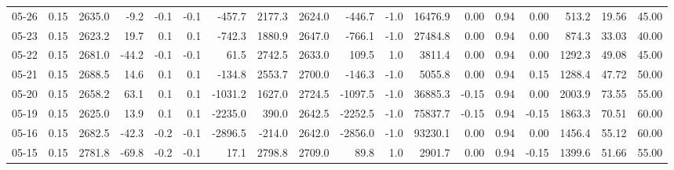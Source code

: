\begin{threeparttable}
{\begin{tabular}{lrrrrrrrrrrrrrrrrr}
  05-26 &     0.15 & 2635.0 &              -9.2 &              -0.1 &               -0.1 &             -457.7 &  2177.3 & 2624.0 &     -446.7 &                     -1.0 &             16476.9 &       0.00 &      0.94 &           0.00 &            513.2 &           19.56 &                  45.00 \\
  05-23 &     0.15 & 2623.2 &              19.7 &               0.1 &                0.1 &             -742.3 &  1880.9 & 2647.0 &     -766.1 &                     -1.0 &             27484.8 &       0.00 &      0.94 &           0.00 &            874.3 &           33.03 &                  40.00 \\
  05-22 &     0.15 & 2681.0 &             -44.2 &              -0.1 &               -0.1 &               61.5 &  2742.5 & 2633.0 &      109.5 &                      1.0 &              3811.4 &       0.00 &      0.94 &           0.00 &           1292.3 &           49.08 &                  45.00 \\
  05-21 &     0.15 & 2688.5 &              14.6 &               0.1 &                0.1 &             -134.8 &  2553.7 & 2700.0 &     -146.3 &                     -1.0 &              5055.8 &       0.00 &      0.94 &           0.15 &           1288.4 &           47.72 &                  50.00 \\
  05-20 &     0.15 & 2658.2 &              63.1 &               0.1 &                0.1 &            -1031.2 &  1627.0 & 2724.5 &    -1097.5 &                     -1.0 &             36885.3 &      -0.15 &      0.94 &           0.00 &           2003.9 &           73.55 &                  55.00 \\
  05-19 &     0.15 & 2625.0 &              13.9 &               0.1 &                0.1 &            -2235.0 &   390.0 & 2642.5 &    -2252.5 &                     -1.0 &             75837.7 &      -0.15 &      0.94 &          -0.15 &           1863.3 &           70.51 &                  60.00 \\
  05-16 &     0.15 & 2682.5 &             -42.3 &              -0.2 &               -0.1 &            -2896.5 &  -214.0 & 2642.0 &    -2856.0 &                     -1.0 &             93230.1 &       0.00 &      0.94 &           0.00 &           1456.4 &           55.12 &                  60.00 \\
  05-15 &     0.15 & 2781.8 &             -69.8 &              -0.2 &               -0.1 &               17.1 &  2798.8 & 2709.0 &       89.8 &                      1.0 &              2901.7 &       0.00 &      0.94 &          -0.15 &           1399.6 &           51.66 &                  55.00 \\

\end{tabular}}
\end{threeparttable}
